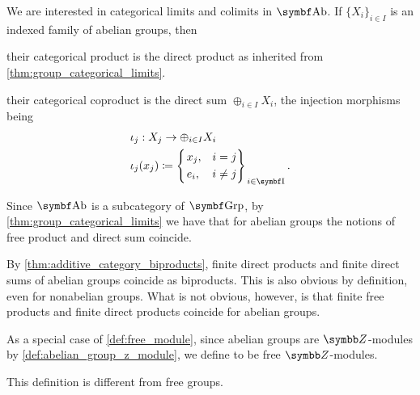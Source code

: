 \begin{proposition}\label{thm:abelian_group_categorical_limits}
  We are interested in categorical limits and colimits in \( \Bold{Ab} \). If \( \{ X_i \}_{i \in I} \) is an indexed family of abelian groups, then
  \begin{defenum}
     their categorical product is the direct product as inherited from \cref{thm:group_categorical_limits}.

     their categorical coproduct is the direct sum \( \oplus_{i \in I} X_i \), the injection morphisms being
    \begin{align*}
      &\iota_j: X_j \to \oplus_{i \in I} X_i \\
      &\iota_j(x_j) \coloneqq \begin{dcases}
        \begin{drcases}
          x_j, &i = j \\
          e_i, &i \neq j
        \end{drcases}
      \end{dcases}_{i \in \Bold I}.
    \end{align*}

    Since \( \Bold{Ab} \) is a subcategory of \( \Bold{Grp} \), by \cref{thm:group_categorical_limits} we have that for abelian groups the notions of free product and direct sum coincide.
  \end{defenum}
\end{proposition}

\begin{remark}\label{remark:abelian_group_biproducts}
  By \cref{thm:additive_category_biproducts}, finite direct products and finite direct sums of abelian groups coincide as biproducts. This is also obvious by definition, even for nonabelian groups. What is not obvious, however, is that finite free products and finite direct products coincide for abelian groups.
\end{remark}

\begin{definition}\label{def:free_abelian_group}
  As a special case of \cref{def:free_module}, since abelian groups are \( \Z \)-modules by \cref{def:abelian_group_z_module}, we define  to be free \( \Z \)-modules.

  This definition is different from free groups.
\end{definition}
